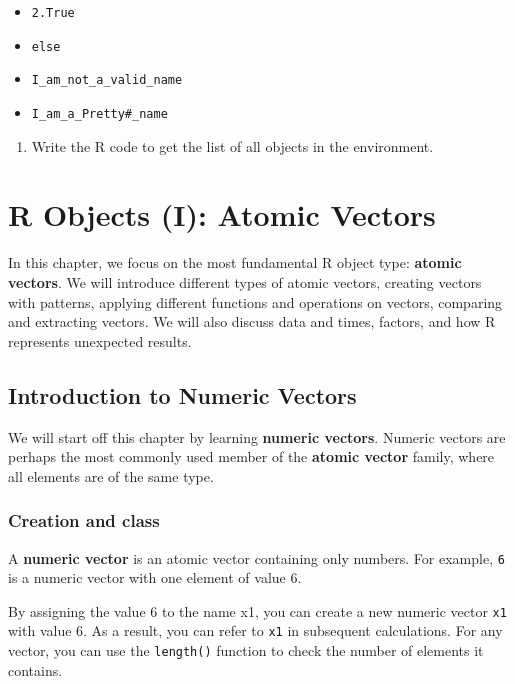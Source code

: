 \documentclass[
]{book}
\providecommand{\tightlist}{%
  \setlength{\itemsep}{0pt}\setlength{\parskip}{0pt}}
\begin{document}
\begin{itemize}
\tightlist
\item
  \texttt{2.True}
\item
  \texttt{else}
\item
  \texttt{I\_am\_not\_a\_valid\_name}
\item
  \texttt{I\_am\_a\_Pretty\#\_name}
\end{itemize}

\begin{enumerate}
\def\labelenumi{\arabic{enumi}.}
\setcounter{enumi}{2}
\tightlist
\item
  Write the R code to get the list of all objects in the environment.
\end{enumerate}

\hypertarget{r-objects}{%
\chapter{R Objects (I): Atomic Vectors}\label{r-objects}}

In this chapter, we focus on the most fundamental R object type: \textbf{atomic vectors}. We will introduce different types of atomic vectors, creating vectors with patterns, applying different functions and operations on vectors, comparing and extracting vectors. We will also discuss data and times, factors, and how R represents unexpected results.

\hypertarget{intro-num-vector}{%
\section{Introduction to Numeric Vectors}\label{intro-num-vector}}

We will start off this chapter by learning \textbf{numeric vectors}. Numeric vectors are perhaps the most commonly used member of the \textbf{atomic vector} family, where all elements are of the same type.

\hypertarget{create-numeric-vector}{%
\subsection{Creation and class}\label{create-numeric-vector}}

A \textbf{numeric vector} is an atomic vector containing only numbers. For example, \texttt{6} is a numeric vector with one element of value 6.

By assigning the value 6 to the name x1, you can create a new numeric vector \texttt{x1} with value 6. As a result, you can refer to \texttt{x1} in subsequent calculations. For any vector, you can use the \texttt{length()} function to check the number of elements it contains.
\end{document}
